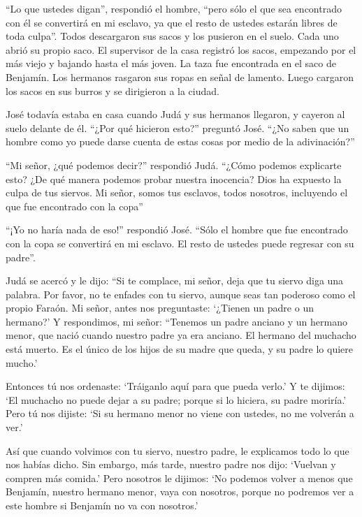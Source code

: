  ``Lo que ustedes digan'', respondió el hombre, ``pero sólo
el que sea encontrado con él se convertirá en mi esclavo, ya que el
resto de ustedes estarán libres de toda culpa''.  Todos
descargaron sus sacos y los pusieron en el suelo. Cada uno abrió su
propio saco.  El supervisor de la casa registró los sacos,
empezando por el más viejo y bajando hasta el más joven. La taza fue
encontrada en el saco de Benjamín.  Los hermanos rasgaron
sus ropas en señal de lamento. Luego cargaron los sacos en sus burros y
se dirigieron a la ciudad.

 José todavía estaba en casa cuando Judá y sus hermanos
llegaron, y cayeron al suelo delante de él.  ``¿Por qué
hicieron esto?'' preguntó José. ``¿No saben que un hombre como yo puede
darse cuenta de estas cosas por medio de la adivinación?''

 ``Mi señor, ¿qué podemos decir?'' respondió Judá. ``¿Cómo
podemos explicarte esto? ¿De qué manera podemos probar nuestra
inocencia? Dios ha expuesto la culpa de tus siervos. Mi señor, somos tus
esclavos, todos nosotros, incluyendo el que fue encontrado con la copa''

 ``¡Yo no haría nada de eso!'' respondió José. ``Sólo el
hombre que fue encontrado con la copa se convertirá en mi esclavo. El
resto de ustedes puede regresar con su padre''.

 Judá se acercó y le dijo: ``Si te complace, mi señor, deja
que tu siervo diga una palabra. Por favor, no te enfades con tu siervo,
aunque seas tan poderoso como el propio Faraón.  Mi señor,
antes nos preguntaste: `¿Tienen un padre o un hermano?'  Y
respondimos, mi señor: ``Tenemos un padre anciano y un hermano menor,
que nació cuando nuestro padre ya era anciano. El hermano del muchacho
está muerto. Es el único de los hijos de su madre que queda, y su padre
lo quiere mucho.'

 Entonces tú nos ordenaste: `Tráiganlo aquí para que pueda
verlo.'  Y te dijimos: `El muchacho no puede dejar a su
padre; porque si lo hiciera, su padre moriría.'  Pero tú
nos dijiste: `Si su hermano menor no viene con ustedes, no me volverán a
ver.'

 Así que cuando volvimos con tu siervo, nuestro padre, le
explicamos todo lo que nos habías dicho.  Sin embargo, más
tarde, nuestro padre nos dijo: `Vuelvan y compren más comida.'
 Pero nosotros le dijimos: `No podemos volver a menos que
Benjamín, nuestro hermano menor, vaya con nosotros, porque no podremos
ver a este hombre si Benjamín no va con nosotros.'

